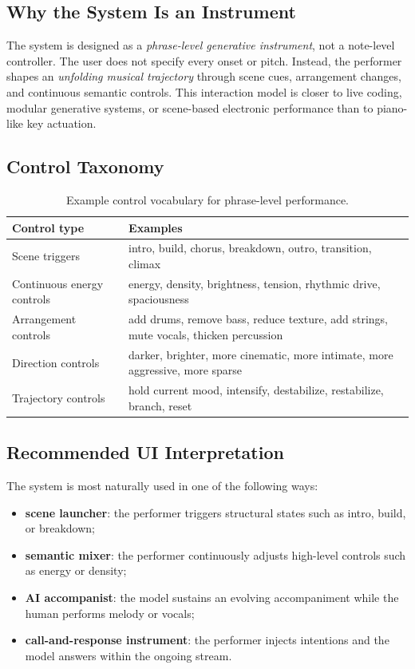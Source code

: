\documentclass[11pt]{article}
\begin{document}
\subsection{Why the System Is an Instrument}

The system is designed as a \emph{phrase-level generative instrument}, not a note-level controller. The user does not specify every onset or pitch. Instead, the performer shapes an \emph{unfolding musical trajectory} through scene cues, arrangement changes, and continuous semantic controls. This interaction model is closer to live coding, modular generative systems, or scene-based electronic performance than to piano-like key actuation.

\subsection{Control Taxonomy}

\begin{table}[H]
\centering
\caption{Example control vocabulary for phrase-level performance.}
\label{tab:supp_controls}
\begin{tabularx}{\textwidth}{@{}lX@{}}
\toprule
\textbf{Control type} & \textbf{Examples} \\
\midrule
Scene triggers & intro, build, chorus, breakdown, outro, transition, climax \\
Continuous energy controls & energy, density, brightness, tension, rhythmic drive, spaciousness \\
Arrangement controls & add drums, remove bass, reduce texture, add strings, mute vocals, thicken percussion \\
Direction controls & darker, brighter, more cinematic, more intimate, more aggressive, more sparse \\
Trajectory controls & hold current mood, intensify, destabilize, restabilize, branch, reset \\
\bottomrule
\end{tabularx}
\end{table}

\subsection{Recommended UI Interpretation}

The system is most naturally used in one of the following ways:
\begin{itemize}
    \item \textbf{scene launcher}: the performer triggers structural states such as intro, build, or breakdown;
    \item \textbf{semantic mixer}: the performer continuously adjusts high-level controls such as energy or density;
    \item \textbf{AI accompanist}: the model sustains an evolving accompaniment while the human performs melody or vocals;
    \item \textbf{call-and-response instrument}: the performer injects intentions and the model answers within the ongoing stream.
\end{itemize}
\end{document}
